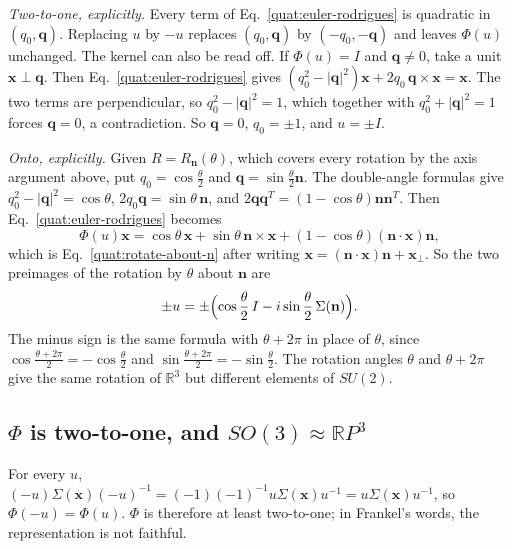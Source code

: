 \emph{Two-to-one, explicitly.} Every term of Eq.~\eqref{quat:euler-rodrigues}
is quadratic in $(q_0,\mathbf q)$. Replacing $u$ by $-u$ replaces
$(q_0,\mathbf q)$ by $(-q_0,-\mathbf q)$ and leaves $\Phi(u)$ unchanged.
The kernel can also be read off. If $\Phi(u)=I$ and $\mathbf q\ne0$, take a
unit $\mathbf x\perp\mathbf q$. Then Eq.~\eqref{quat:euler-rodrigues} gives
$(q_0^2-|\mathbf q|^2)\mathbf x+2q_0\,\mathbf q\times\mathbf x=\mathbf x$. The
two terms are perpendicular, so $q_0^2-|\mathbf q|^2=1$, which together with
$q_0^2+|\mathbf q|^2=1$ forces $\mathbf q=0$, a contradiction. So
$\mathbf q=0$, $q_0=\pm1$, and $u=\pm I$.

\emph{Onto, explicitly.} Given $R=R_{\mathbf n}(\theta)$, which covers every
rotation by the axis argument above, put $q_0=\cos\frac{\theta}{2}$ and
$\mathbf q=\sin\frac{\theta}{2}\mathbf n$. The double-angle formulas give
$q_0^2-|\mathbf q|^2=\cos\theta$, $2q_0\mathbf q=\sin\theta\,\mathbf n$, and
$2\mathbf q\mathbf q^T=(1-\cos\theta)\mathbf n\mathbf n^T$. Then
Eq.~\eqref{quat:euler-rodrigues} becomes
\begin{equation}
 \Phi(u)\mathbf x=\cos\theta\,\mathbf x+\sin\theta\,\mathbf n\times\mathbf x
 +(1-\cos\theta)(\mathbf n\cdot\mathbf x)\mathbf n ,
\end{equation}
which is Eq.~\eqref{quat:rotate-about-n} after writing
$\mathbf x=(\mathbf n\cdot\mathbf x)\mathbf n+\mathbf x_\perp$. So the two
preimages of the rotation by $\theta$ about $\mathbf n$ are
\begin{equation}\label{quat:two-preimages}
 \pm u=\pm\Bigl(\cos\frac{\theta}{2}\,I-i\sin\frac{\theta}{2}\,\Sigma(\mathbf n)\Bigr).
\end{equation}
The minus sign is the same formula with $\theta+2\pi$ in place of $\theta$,
since $\cos\frac{\theta+2\pi}{2}=-\cos\frac{\theta}{2}$ and
$\sin\frac{\theta+2\pi}{2}=-\sin\frac{\theta}{2}$. The rotation angles
$\theta$ and $\theta+2\pi$ give the same rotation of $\mathbb R^3$ but
different elements of $SU(2)$.

\subsection{\texorpdfstring{$\Phi$}{Phi} is two-to-one, and \texorpdfstring{$SO(3)\approx\mathbb RP^3$}{SO(3) = RP3}}
For every $u$, $(-u)\Sigma(\mathbf x)(-u)^{-1}
=(-1)(-1)^{-1}u\Sigma(\mathbf x)u^{-1}=u\Sigma(\mathbf x)u^{-1}$, so
$\Phi(-u)=\Phi(u)$. $\Phi$ is therefore at least two-to-one; in Frankel's
words, the representation is not faithful.

